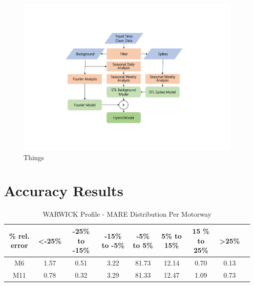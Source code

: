 \documentclass[letterpaper, 10 pt, conference]{ieeeconf}  %
\begin{document}
\begin{figure}[htbp]
	\centerline{\includegraphics[width=\linewidth]{./images/flow_temp.pdf}}
	\caption{Things}
	\label{fig:dataflow}
\end{figure}



\section{Accuracy Results}
\begin{table}[bp]
	\caption{WARWICK Profile - MARE Distribution Per Motorway}
	\centering
	\begin{center}	
		\begin{tabular}{|C|C|C|C|C|C|C|C|C|}
			\hline
			\textbf{\% rel. error}&{\textless -25\%}&{-25\%\textbf{ to }-15\%}&{-15\%\textbf{ to }-5\%}&{-5\%\textbf{ to }5\%}&{5\%\textbf{ to }15\%}&{15 \%\textbf{ to }25\%}&{\textgreater 25\%}\\
			\hline
			M6& 1.57& 0.51& 3.22& 81.73& 12.14& 0.70& 0.13\\
			\hline
			M11& 0.78& 0.32& 3.29& 81.33& 12.47& 1.09& 0.73\\
			\hline
		\end{tabular}
		\label{mapeglobal}
	\end{center}
\end{table}
\end{document}
